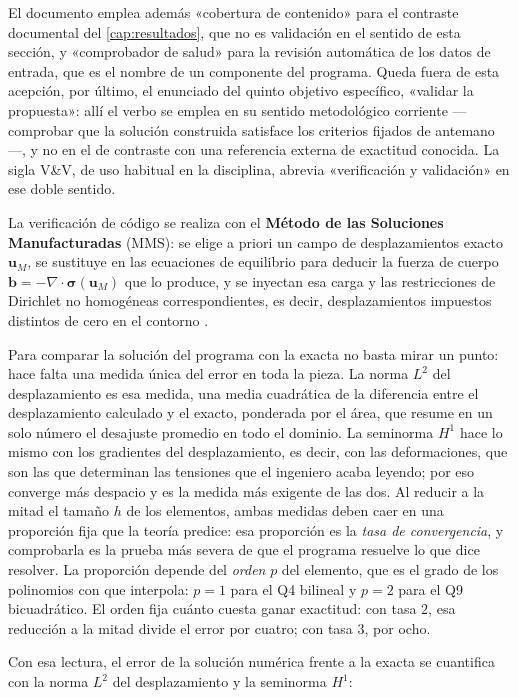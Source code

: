 El documento emplea además «cobertura de contenido» para el contraste documental del \autoref{cap:resultados}, que no es validación en el sentido de esta sección, y «comprobador de salud» para la revisión automática de los datos de entrada, que es el nombre de un componente del programa. Queda fuera de esta acepción, por último, el enunciado del quinto objetivo específico, «validar la propuesta»: allí el verbo se emplea en su sentido metodológico corriente ---comprobar que la solución construida satisface los criterios fijados de antemano---, y no en el de contraste con una referencia externa de exactitud conocida. La sigla V\&V, de uso habitual en la disciplina, abrevia «verificación y validación» en ese doble sentido.

La verificación de código se realiza con el \textbf{Método de las Soluciones Manufacturadas} (MMS): se elige a priori un campo de desplazamientos exacto $\bm{u}_M$, se sustituye en las ecuaciones de equilibrio para deducir la fuerza de cuerpo $\bm{b} = -\nabla\cdot\bm{\sigma}(\bm{u}_M)$ que lo produce, y se inyectan esa carga y las restricciones de Dirichlet no homogéneas correspondientes, es decir, desplazamientos impuestos distintos de cero en el contorno \autocites[pp.~21, 26]{salari2000mms}[pp.~219-222]{oberkampf2010vv}.

Para comparar la solución del programa con la exacta no basta mirar un punto: hace falta una medida única del error en toda la pieza. La norma $L^2$ del desplazamiento es esa medida, una media cuadrática de la diferencia entre el desplazamiento calculado y el exacto, ponderada por el área, que resume en un solo número el desajuste promedio en todo el dominio. La seminorma $H^1$ hace lo mismo con los gradientes del desplazamiento, es decir, con las deformaciones, que son las que determinan las tensiones que el ingeniero acaba leyendo; por eso converge más despacio y es la medida más exigente de las dos. Al reducir a la mitad el tamaño $h$ de los elementos, ambas medidas deben caer en una proporción fija que la teoría predice: esa proporción es la \emph{tasa de convergencia}, y comprobarla es la prueba más severa de que el programa resuelve lo que dice resolver. La proporción depende del \emph{orden} $p$ del elemento, que es el grado de los polinomios con que interpola: $p = 1$ para el Q4 bilineal y $p = 2$ para el Q9 bicuadrático. El orden fija cuánto cuesta ganar exactitud: con tasa $2$, esa reducción a la mitad divide el error por cuatro; con tasa $3$, por ocho.

Con esa lectura, el error de la solución numérica frente a la exacta se cuantifica con la norma $L^2$ del desplazamiento y la seminorma $H^1$:

